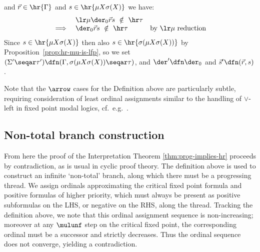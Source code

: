 \begin{definition}
\begin{itemize}
    \)
    and $\vec r \in \hr{\Gamma}$ and $s \in \hr{\mu X \sigma(X)}$ we have:
    \[
    \begin{array}{rll}
         &  \lr \mu\der_0 \vec r s \ \notin \ \hr\tau \\
        \implies & \der_0 \vec r s \ \notin\  \hr \tau  & \text{by $\lr \mu$ reduction}
    \end{array}
    \]
    Since $s \in \hr{\mu X \sigma(X)}$ then also $s \in \hr{\sigma(\mu X \sigma(X))}$ by Proposition~\ref{prop:hr-mu-is-lfp},
    so we set $(\Sigma' \seqar \tau') \dfn (\Gamma , \sigma(\mu X \sigma(X)) \seqar \tau)$, and $ \der' \dfn \der_0$ and $\vec s' \dfn (\vec r , s)$.
    \end{itemize}
\end{definition}

   Note that the $\arrow$ cases for the Definition above are particularly subtle, requiring consideration of least ordinal assignments similar to the handling of $\lor$-left in fixed point modal logics, cf.\ e.g.\ \cite{NiwWal96:games-for-mu-calc}.




\subsection{Non-total branch construction}
From here the proof of the Interpretation Theorem \ref{thm:prog-implies-hr} proceeds by contradiction, as is usual in cyclic proof theory.
The definition above is used to construct an infinite `non-total' branch, along which there must be a progressing thread.
We assign ordinals approximating the critical fixed point formula and positive formulas of higher priority, which must always be present as positive subformulas on the LHS, or negative on the RHS, along the thread.
Tracking the definition above, we note that this ordinal assignment sequence is non-increasing; moreover at any $\mulunf$ step on the critical fixed point, the corresponding ordinal must be a successor and strictly decreases. 
Thus the ordinal sequence does not converge, yielding a contradiction.







